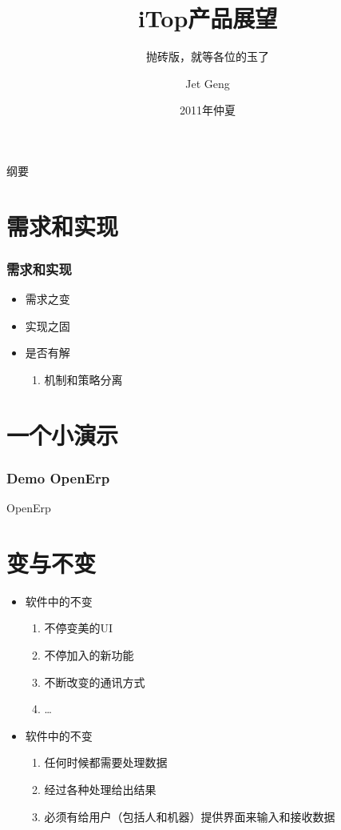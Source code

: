 \documentclass{beamer}
\title[iTop产品展望]{iTop产品展望}
\subtitle[LaTeX for slide]{抛砖版，就等各位的玉了}
\author[Jet Geng]{Jet Geng}
\institute[zthz.com.cn]{中天合志研发中心}
\date[Dec, 2011]{2011年仲夏}
\begin{document}
\begin{frame}
	\titlepage
\end{frame}

\begin{frame}{纲要}
 	\tableofcontents
 \end{frame}

\section{需求和实现}
\begin{frame}
    \frametitle{需求和实现}
    \begin{itemize}
        \item 需求之变
        \item 实现之固
        \item 是否有解
            \begin{enumerate}
                \item 机制和策略分离
            \end{enumerate}
    \end{itemize}
\end{frame}

\section{一个小演示}
\begin{frame}
    \frametitle{Demo OpenErp}
     \begin{centering}
      \Huge OpenErp \par
    \end{centering}
\end{frame}

\section{变与不变}
\begin{frame}
    \begin{itemize}
        \item 软件中的不变
            \begin{enumerate}
                \item 不停变美的UI
                \item 不停加入的新功能
                \item 不断改变的通讯方式
                \item \ldots 
            \end{enumerate}
        \item 软件中的不变
            \begin{enumerate}
                \item 任何时候都需要处理数据
                \item 经过各种处理给出结果
                \item 必须有给用户（包括人和机器）提供界面来输入和接收数据
            \end{enumerate}
    \end{itemize}
\end{frame}
\end{document}
